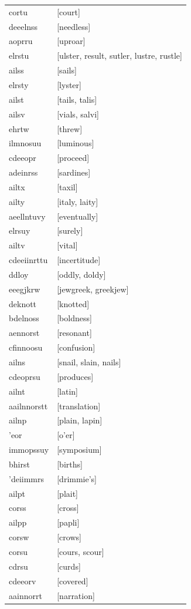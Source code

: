 \documentclass{article}
\begin{document}
\begin{tabular}{ll}
cortu & [court] \\
deeelnss & [needless] \\
aoprru & [uproar] \\
elrstu & [ulster, result, sutler, lustre, rustle] \\
ailss & [sails] \\
elrsty & [lyster] \\
ailst & [tails, talis] \\
ailsv & [vials, salvi] \\
ehrtw & [threw] \\
ilmnosuu & [luminous] \\
cdeeopr & [proceed] \\
adeinrss & [sardines] \\
ailtx & [taxil] \\
ailty & [italy, laity] \\
aeellntuvy & [eventually] \\
elrsuy & [surely] \\
ailtv & [vital] \\
cdeeiinrttu & [incertitude] \\
ddloy & [oddly, doldy] \\
eeegjkrw & [jewgreek, greekjew] \\
deknott & [knotted] \\
bdelnoss & [boldness] \\
aennorst & [resonant] \\
cfinnoosu & [confusion] \\
ailns & [snail, slain, nails] \\
cdeoprsu & [produces] \\
ailnt & [latin] \\
aailnnorstt & [translation] \\
ailnp & [plain, lapin] \\
'eor & [o'er] \\
immopssuy & [symposium] \\
bhirst & [births] \\
'deiimmrs & [drimmie's] \\
ailpt & [plait] \\
corss & [cross] \\
ailpp & [papli] \\
corsw & [crows] \\
corsu & [cours, scour] \\
cdrsu & [curds] \\
cdeeorv & [covered] \\
aainnorrt & [narration] \\

\end{tabular}
\end{document}
